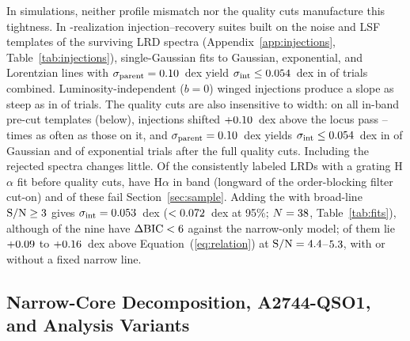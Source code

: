 \documentclass[twocolumn,linenumbers]{aastex701}
\newcommand{\Ha}{H$\alpha$}
\newcommand{\sigint}{\sigma_{\rm int}}
\begin{document}
In simulations, neither profile mismatch nor the quality cuts manufacture this tightness.
In \NReal{}-realization injection--recovery suites built on the noise and LSF templates of the \NLRD{} surviving LRD spectra (Appendix~\ref{app:injections}, Table~\ref{tab:injections}), single-Gaussian fits to Gaussian, exponential, and Lorentzian lines with $\sigma_{\rm parent}=0.10{}$~dex yield $\sigint\leq\Fsig{}$~dex in \hitTenAll{} of \nullDenThree{} trials combined.
Luminosity-independent ($b=0$) winged injections produce a slope as steep as \Fb{} in \hitSlopeNull{} of \nullDen{} trials.
The quality cuts are also insensitive to width: on all \NParentInBand{} in-band pre-cut templates (below), injections shifted $+0.10{}$~dex above the locus pass \passRatLo{}--\passRatHi{} times as often as those on it, and $\sigma_{\rm parent}=0.10{}$~dex yields $\sigint\leq\Fsig{}$~dex in \hitParTenG{} of \NReal{} Gaussian and \hitParTenE{} of \NReal{} exponential trials after the full quality cuts.
Including the rejected spectra changes little.
Of the \NParentClean{} consistently labeled LRDs with a grating \Ha{} fit before quality cuts, \NParentInBand{} have \Ha{} in band (longward of the order-blocking filter cut-on) and \NParentFail{} of these fail Section~\ref{sec:sample}.
Adding the \NFailSNthree{} with broad-line ${\rm S/N}\geq3{}$ gives $\sigint=\FsigSNthree{}$~dex ($<0.072{}$~dex at 95\%; $N=38{}$, Table~\ref{tab:fits}), although \NFailSNthreeWeak{} of the nine have $\Delta{\rm BIC}<6{}$ against the narrow-only model; \NFailPosUDS{} of them lie $+0.09{}$ to $+0.16{}$~dex above Equation~(\ref{eq:relation}) at ${\rm S/N}=4.4{}$--$5.3{}$, with or without a fixed narrow line.

\subsection{Narrow-Core Decomposition, A2744-QSO1, and Analysis Variants} \label{sec:variants}
\end{document}
